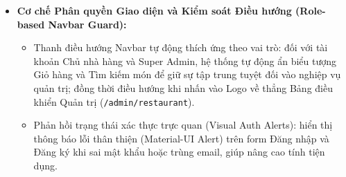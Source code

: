 \documentclass{uetgraduation}
\begin{document}
\begin{itemize}
    \begin{itemize}
        \item Xem danh sách toàn bộ người dùng trong hệ thống và khóa/mở hoặc phân quyền tài khoản.
        \item Xem danh sách các nhà hàng trên toàn hệ thống và thực hiện xóa các nhà hàng vi phạm chính sách sàn.
        \item Kiểm duyệt danh sách đánh giá theo từng nhà hàng được chọn và xóa bỏ các bài viết có nội dung phản cảm, vi phạm chuẩn mực.
        \item Tương tác với \textbf{Platform Executive AI Copilot \& AI Content Moderation Sentinel}: giám sát tổng GMV toàn sàn, phân tích chỉ số hài lòng CSAT và kích hoạt các quyết định tác tử 1-Click: (i) Gỡ bỏ đánh giá vi phạm chuẩn mực cộng đồng hoặc an toàn thực phẩm (\texttt{MODERATE\_REVIEW}) với sự hỗ trợ của cơ chế tự phục hồi dữ liệu mẫu (\textbf{Self-healing Demo Data Sentinel}); (ii) Kích hoạt chiến dịch Mega Sale toàn sàn phát hành mã giảm giá quy mô lớn (\texttt{CREATE\_GLOBAL\_COUPON}: mã \texttt{FREESHIP\_AI} tài trợ 15.000đ vận chuyển).
        \item Khởi tạo các mã giảm giá áp dụng toàn sàn (Global Coupons) với điều kiện ràng buộc giá trị đơn tối thiểu.
        \item Báo cáo thống kê doanh thu toàn sàn, tổng quan mạng lưới nhà hàng đối tác và biểu đồ tăng trưởng.
    \end{itemize}
    \item \textbf{Cơ chế Phân quyền Giao diện và Kiểm soát Điều hướng (Role-based Navbar Guard):}
    \begin{itemize}
        \item Thanh điều hướng Navbar tự động thích ứng theo vai trò: đối với tài khoản Chủ nhà hàng và Super Admin, hệ thống tự động ẩn biểu tượng Giỏ hàng và Tìm kiếm món để giữ sự tập trung tuyệt đối vào nghiệp vụ quản trị; đồng thời điều hướng khi nhấn vào Logo về thẳng Bảng điều khiển Quản trị (\texttt{/admin/restaurant}).
        \item Phản hồi trạng thái xác thực trực quan (Visual Auth Alerts): hiển thị thông báo lỗi thân thiện (Material-UI Alert) trên form Đăng nhập và Đăng ký khi sai mật khẩu hoặc trùng email, giúp nâng cao tính tiện dụng.
    \end{itemize}
\end{itemize}
\end{document}

